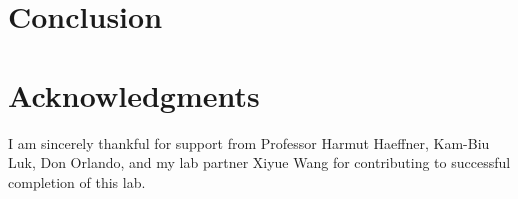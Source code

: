 \documentclass[iop,revtex4]{emulateapj_mod}
\begin{document}
\section{Conclusion}\label{sec:conclusion}
 
\acknowledgments
\section*{Acknowledgments}
I am sincerely thankful for support from Professor Harmut Haeffner, Kam-Biu Luk, Don Orlando, and my lab partner Xiyue Wang for contributing to successful completion of this lab.


\end{document}
